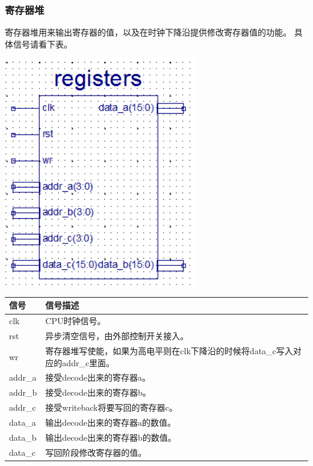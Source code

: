 \subsubsection{寄存器堆}
    寄存器堆用来输出寄存器的值，以及在时钟下降沿提供修改寄存器值的功能。
    具体信号请看下表。
\begin{center}
    \includegraphics[height=10cm]{image/detail/detail_register.png}
    \label{fig:register}
\end{center}
\begin{center}
    \label{table:register}
    \begin{longtable}{p{}p{}}
        \toprule
        信号 & 信号描述 \\
        \midrule
            clk & CPU时钟信号。\\
            rst &  异步清空信号，由外部控制开关接入。\\
            wr & 寄存器堆写使能，如果为高电平则在clk下降沿的时候将data\_c写入对应的addr\_c里面。\\
            addr\_a & 接受decode出来的寄存器a。\\
            addr\_b & 接受decode出来的寄存器b。\\
            addr\_c & 接受writeback将要写回的寄存器c。\\
            data\_a & 输出decode出来的寄存器a的数值。\\
            data\_b & 输出decode出来的寄存器b的数值。\\
            data\_c & 写回阶段修改寄存器的值。\\
        \bottomrule
    \end{longtable}
\end{center}


